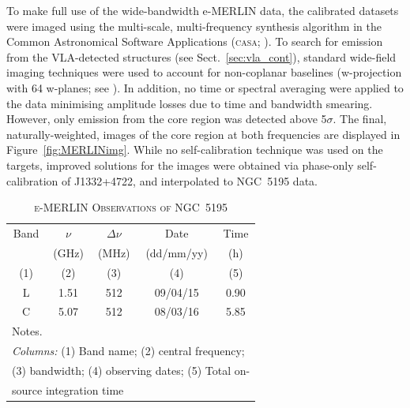 \documentclass[fleqn,usenatbib]{mnras}
\def\fig{Figure}
\def\sect{Sect.}
\begin{document}
To make full use of the {wide-bandwidth e-MERLIN data}, the calibrated datasets were imaged using the 
multi-scale, multi-frequency synthesis \citep{RC2011} algorithm in the Common Astronomical Software 
Applications (\textsc{casa}; \citealt{McMullin+07}). To search for emission from the VLA-detected structures (see 
\sect~\ref{sec:vla_cont}), standard wide-field imaging techniques were used to account for non-coplanar 
baselines (w-projection with 64 w-planes{; see} \cite{Cornwelletal2008}). {In addition, no 
time or spectral averaging were applied to the data minimising amplitude losses due to time and bandwidth 
smearing.} However, only emission from the core region was detected above 5$\sigma$. The final, naturally-weighted, images of the core region at both frequencies are displayed in \fig~\ref{fig:MERLINimg}. While 
no self-calibration technique was used on the targets, improved solutions for the
images were obtained via phase-only self-calibration of J1332+4722, and interpolated to NGC~5195 data. 



\begin{center}
\begin{table}\footnotesize
\caption{\textsc{e-MERLIN Observations of NGC~5195}}
\label{tab:eMerObs}
\hfill{}
\begin{tabular}{ccccc}
\hline\hline
\noalign{\smallskip}
 Band & $\nu$ & $\Delta\nu$ & Date & Time  \\ 
 & (GHz) & (MHz) & (dd/mm/yy)  & (h) \\ 
(1)   & (2)   &  (3) & (4) & (5)\\ 
 \hline 
L & 1.51 & 512 & 09/04/15 & 0.90 \\
C & 5.07 & 512 & 08/03/16 & 5.85 \\
\hline
\hline
\multicolumn{5}{l}{{Notes.}}\\
\multicolumn{5}{l}{\textit{Columns: }(1) Band name; (2) central frequency; }\\
\multicolumn{5}{l}{ (3)  bandwidth; (4) observing dates; (5) Total on-}\\
\multicolumn{5}{l}{source integration time}

\end{tabular}
\hfill{}
\end{table}
\end{center}
\end{document}
